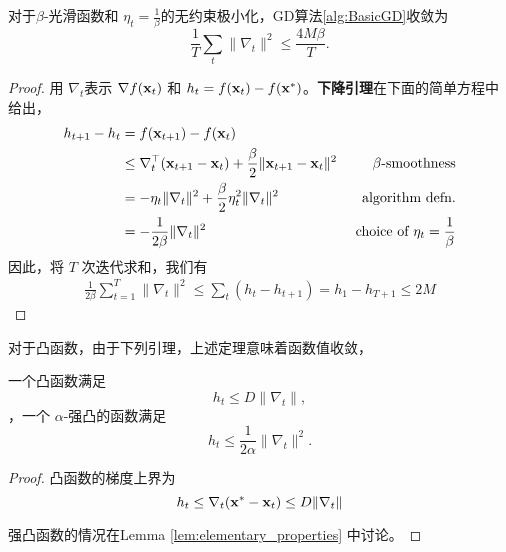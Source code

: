 \begin{theorem} \label{thm:basicGDunconstrained}
对于$\beta$-光滑函数和 $\eta_t=\frac{1}{\beta}$的无约束极小化，GD算法\ref{alg:BasicGD}收敛为
$$ \frac{1}{T} \sum_t \| \nabla_t  \|^2 \leq  \frac{4 M \beta}{T} .$$
\end{theorem}
\begin{proof}
用 $\nabla_t$表示 $\nabla f(\mathbf x_t)$ 和  $h_t = f(\mathbf x_t) - f(\mathbf x^*)$。{\bf 下降引理}在下面的简单方程中给出，
\begin{align*}
h_{t+1} - h_t & =  f(\mathbf x_{t+1})  - f(\mathbf x_t) \\
& \le   \nabla_t^\top (\mathbf x_{t+1} - \mathbf x_t) + \frac{\beta}{2} \|\mathbf x_{t+1} - \mathbf x_t\|^2 & \text{ $\beta$-smoothness} \\
& =  - \eta_t \|\nabla_t \|^2 + \frac{\beta}{2} \eta_t^2  \|\nabla_t\|^2 & \text{ algorithm defn.} \\
& =  - \frac{1}{2\beta} \|\nabla_t \|^2  & \text{ choice of $\eta_t=\frac{1}{\beta}$} 
\end{align*}
因此，将 $T$ 次迭代求和，我们有
\begin{eqnarray*}
 \frac{1}{2\beta} \sum_{t=1}^T \|\nabla_t \|^2 \leq \sum_t (h_t - h_{t+1}) =  h_1 - h_{T+1} \leq  2 M
\end{eqnarray*}
\end{proof}


对于凸函数，由于下列引理，上述定理意味着函数值收敛，
\begin{lemma}
一个凸函数满足
$$ h_t \leq D \| \nabla_t \|  ,   $$
，一个 $\alpha$-强凸的函数满足
$$ h_t \leq  \frac{1}{2 \alpha} \|\nabla_t\|^2 .   $$
\end{lemma}
\begin{proof}
凸函数的梯度上界为
$$ h_t \leq \nabla_t ( \mathbf x^* - \mathbf x_t) \leq D  \| \nabla_t \|  $$

强凸函数的情况在Lemma \ref{lem:elementary_properties} 中讨论。

\end{proof}





